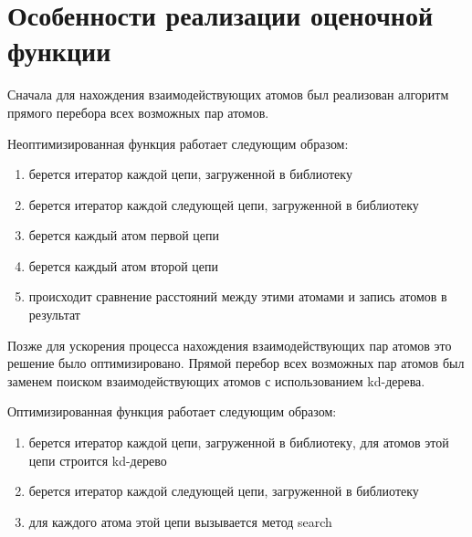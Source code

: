 \section{Особенности реализации оценочной функции}


Сначала для нахождения взаимодействующих атомов был реализован алгоритм прямого перебора всех возможных пар атомов.

Неоптимизированная функция работает следующим образом:

\begin{enumerate}
	\item берется итератор каждой цепи, загруженной в библиотеку
	\item берется итератор каждой следующей цепи, загруженной в библиотеку
	\item берется каждый атом первой цепи
	\item берется каждый атом второй цепи
	\item происходит сравнение расстояний между этими атомами и запись атомов в результат
\end{enumerate} 


Позже для ускорения процесса нахождения взаимодействующих пар атомов это решение было оптимизировано. Прямой перебор всех возможных пар атомов был заменем поиском взаимодействующих атомов с использованием kd-дерева.


Оптимизированная функция работает следующим образом:

\begin{enumerate}
	\item берется итератор каждой цепи, загруженной в библиотеку, для атомов этой цепи строится kd-дерево
	\item берется итератор каждой следующей цепи, загруженной в библиотеку
	\item для каждого атома этой цепи вызывается метод search
\end{enumerate} 


